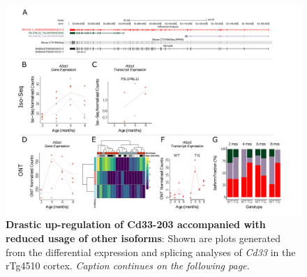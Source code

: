 \begin{landscape}
	\begin{figure}[htp]
		\begin{center}
			\includegraphics[page=7,trim={0 0.5cm 0 1.5cm},scale =0.85]{Figures/TargetGene_DifferentialAnalysis.pdf}
		\end{center}
		\captionsetup{width=1.5\textwidth}
		\caption[Differential \textit{Cd33} transcript expression and usage]%
		{\textbf{Drastic up-regulation of Cd33-203 accompanied with reduced usage of other isoforms}: Shown are plots generated from the differential expression and splicing analyses of \textit{Cd33} in the rTg4510 cortex. \textit{Caption continues on the following page.}}   
		\label{fig:cd33_diff_analysis}
	\end{figure}
\end{landscape}
